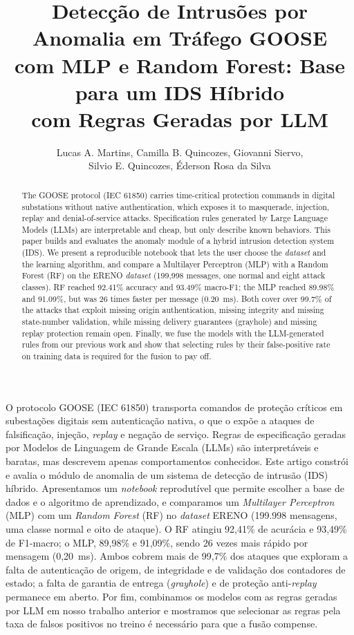\documentclass[12pt]{article}
\title{Detecção de Intrusões por Anomalia em Tráfego GOOSE\\
com MLP e Random Forest: Base para um IDS Híbrido\\ com Regras Geradas por LLM}
\author{
Lucas A. Martins\inst{1},
Camilla B. Quincozes\inst{1}, Giovanni Siervo\inst{1},\\
Silvio E. Quincozes\inst{1,2}, Éderson Rosa da Silva\inst{1}
}
\begin{document}
\maketitle

\begin{abstract}
The GOOSE protocol (IEC 61850) carries time-critical protection commands in
digital substations without native authentication, which exposes it to
masquerade, injection, replay and denial-of-service attacks. Specification
rules generated by Large Language Models (LLMs) are interpretable and cheap,
but only describe known behaviors. This paper builds and evaluates the anomaly
module of a hybrid intrusion detection system (IDS). We present a reproducible
notebook that lets the user choose the \textit{dataset} and the learning algorithm, and
compare a Multilayer Perceptron (MLP) with a Random Forest (RF) on the ERENO
\textit{dataset} (199,998 messages, one normal and eight attack classes). RF reached
92.41\% accuracy and 93.49\% macro-F1; the MLP reached 89.98\% and 91.09\%,
but was 26 times faster per message (0.20~ms). Both cover over 99.7\% of the
attacks that exploit missing origin authentication, missing integrity and
missing state-number validation, while missing delivery guarantees (grayhole)
and missing replay protection remain open. Finally, we fuse the models with the
LLM-generated rules from our previous work and show that selecting rules by
their false-positive rate on training data is required for the fusion to pay off.
\end{abstract}

\begin{resumo}
O protocolo GOOSE (IEC 61850) transporta comandos de proteção críticos em
subestações digitais sem autenticação nativa, o que o expõe a ataques de
falsificação, injeção, \textit{replay} e negação de serviço. Regras de
especificação geradas por Modelos de Linguagem de Grande Escala (LLMs) são
interpretáveis e baratas, mas descrevem apenas comportamentos conhecidos. Este
artigo constrói e avalia o módulo de anomalia de um sistema de detecção de
intrusão (IDS) híbrido. Apresentamos um \textit{notebook} reprodutível que
permite escolher a base de dados e o algoritmo de aprendizado, e comparamos um
\textit{Multilayer Perceptron} (MLP) com um \textit{Random Forest} (RF) no
\textit{dataset} ERENO (199.998 mensagens, uma classe normal e oito de ataque). O RF
atingiu 92,41\% de acurácia e 93,49\% de F1-macro; o MLP, 89,98\% e 91,09\%,
sendo 26 vezes mais rápido por mensagem (0,20~ms). Ambos cobrem mais de 99,7\%
dos ataques que exploram a falta de autenticação de origem, de integridade e de
validação dos contadores de estado; a falta de garantia de entrega
(\textit{grayhole}) e de proteção anti-\textit{replay} permanece em aberto.
Por fim, combinamos os modelos com as regras geradas por LLM em nosso trabalho
anterior e mostramos que selecionar as regras pela taxa de falsos positivos no
treino é necessário para que a fusão compense.
\end{resumo}
\end{document}
